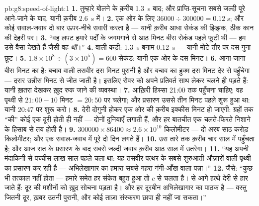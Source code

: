 \begin{solution}{pb:g8:speed-of-light:1}
\textbf{1.} तुम्हारे बोलने के क़रीब \qty{1.3}{s} बाद; और
प्राप्ति-सूचना सबसे जल्दी पूरे आने-जाने के बाद, यानी क़रीब
\qty{2.6}{s} में।
\textbf{2.} एक ओर के लिए $36000 \div 300000 = \qty{0.12}{s}$; और कोई
सवाल-जवाब दो बार ऊपर-नीचे सवारी करता है --- यानी क़रीब आधा सेकंड की
झिझक, ठीक कान की देहरी पर।
\textbf{3.} ``वह लपट हमारे पर्दों के जगमगाने से आठ मिनट बीस सेकंड
पहले फूटी थी --- हम उसे वैसा देखते हैं जैसी वह \emph{थी}।''
\textbf{4.}  वाली कड़ी: \qty{1.3}{s} बनाम \qty{0.12}{s} ---
यानी मोटे तौर पर दस गुना छूट।
\textbf{5.} $1.8 \times 10^{8} \div (3 \times 10^{5}) = 600$ सेकंड:
यानी एक ओर के दस मिनट।
\textbf{6.} आना-जाना बीस मिनट का है: बचाव वाली तसवीर दस मिनट पुरानी
है और बचाव का हुक्म दस मिनट देर से पहुँचेगा --- दरार उन्नीस मिनट से
जीत जाती है। इसलिए रोवर को अपने प्रतिवर्त साथ लेकर चलने ही पड़ते हैं:
यानी ख़तरा देखकर ख़ुद रुक जाने की व्यवस्था।
\textbf{7.} आख़िरी हिस्सा 21:00 तक पहुँचना चाहिए; वह पृथ्वी से
$21{:}00 - 10$ मिनट $= 20{:}50$ पर चलेगा; और प्रसारण उससे तीन मिनट
पहले शुरू हुआ था: यानी 20:47 पर शुरू करो।
\textbf{8.} देरी दोगुनी होकर एक ओर की क़रीब इक्कीस मिनट हो जाएगी:
ग्रहों तक ``की'' कोई एक दूरी होती ही नहीं --- दोनों दुनियाएँ 
लगाती हैं, और हर बातचीत एक चलते-फिरते निशाने के हिसाब से तय होती है।
\textbf{9.} $300000 \times 86400 \approx 2.6 \times 10^{10}$
किलोमीटर --- दो अरब साठ करोड़ किलोमीटर; और एक सवाल-जवाब में पूरे
दो दिन लगते हैं।
\textbf{10.}  उस तारे तक क़रीब चार साल में पहुँचता है; और
आज रात के प्रसारण के बाद सबसे जल्दी जवाब क़रीब आठ साल में उतरेगा।
\textbf{11.} ``यह  अपनी मंदाकिनी से पच्चीस लाख साल पहले चला था:
यह तसवीर पत्थर के सबसे शुरुआती औज़ारों वाली पृथ्वी का प्रसारण कर रही
है --- अभिलेखागार का हमारा सबसे गहरा नंगी-आँख वाला पन्ना।''
\textbf{12.} जैसे: ``कुछ भी तत्काल नहीं होता --- हमारे समेत हर संकेत
बहुत हुआ तो $c$ से चलता है।  से आगे हत्थे देरी से हार जाते हैं:
दूर की मशीनों को ख़ुद सोचना पड़ता है। और हर दूरबीन अभिलेखागार का पाठक
है --- वस्तु जितनी दूर, ख़बर उतनी पुरानी, और कोई ताज़ा संस्करण छापा ही
नहीं जा सकता।''
\end{solution}
